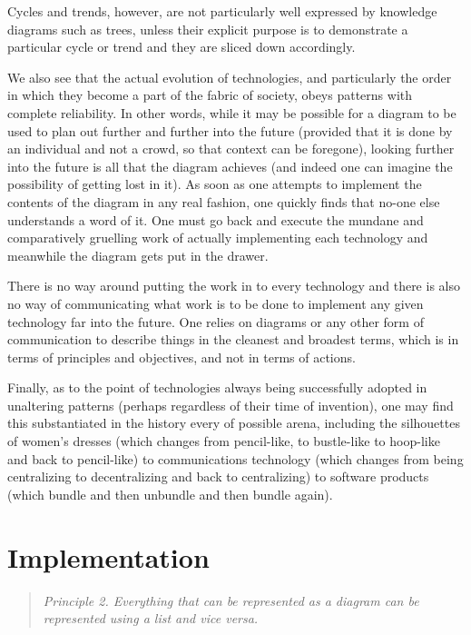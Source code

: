 \documentclass{article}
\begin{document}
\begin{multicols}{2}
Cycles and trends, however, are not particularly well expressed by knowledge diagrams such as trees, unless their explicit purpose is to demonstrate a particular cycle or trend and they are sliced down accordingly.

We also see that the actual evolution of technologies, and particularly the order in which they become a part of the fabric of society, obeys patterns with complete reliability. In other words, while it may be possible for a diagram to be used to plan out further and further into the future (provided that it is done by an individual and not a crowd, so that context can be foregone), looking further into the future is all that the diagram achieves (and indeed one can imagine the possibility of getting lost in it). As soon as one attempts to implement the contents of the diagram in any real fashion, one quickly finds that no-one else understands a word of it. One must go back and execute the mundane and comparatively gruelling work of actually implementing each technology and meanwhile the diagram gets put in the drawer.

There is no way around putting the work in to every technology and there is also no way of communicating what work is to be done to implement any given technology far into the future. One relies on diagrams or any other form of communication to describe things in the cleanest and broadest terms, which is in terms of principles and objectives, and not in terms of actions.

Finally, as to the point of technologies always being successfully adopted in unaltering patterns (perhaps regardless of their time of invention), one may find this substantiated in the history every of possible arena, including the silhouettes of women's dresses (which changes from pencil-like, to bustle-like to hoop-like and back to pencil-like) to communications technology (which changes from being centralizing to decentralizing and back to centralizing) to software products (which bundle and then unbundle and then bundle again).

\section{Implementation}

\begin{quote}

\textit{\phantom
{Principle 2. Everything that can be represented as a diagram can be represented using a list and vice versa.}
}
\end{quote}



\end{multicols}
\end{document}
